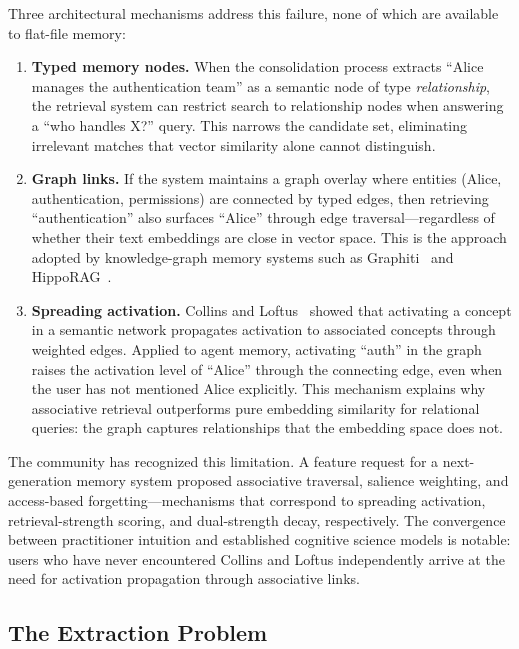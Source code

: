 Three architectural mechanisms address this failure, none of which are
available to flat-file memory:

\begin{enumerate}[leftmargin=*, nosep]
    \item \textbf{Typed memory nodes.}  When the consolidation process
    extracts ``Alice manages the authentication team'' as a semantic
    node of type \emph{relationship}, the retrieval system can restrict
    search to relationship nodes when answering a ``who handles X?''
    query.  This narrows the candidate set, eliminating irrelevant
    matches that vector similarity alone cannot distinguish.

    \item \textbf{Graph links.}  If the system maintains a graph
    overlay where entities (Alice, authentication, permissions) are
    connected by typed edges, then retrieving ``authentication'' also
    surfaces ``Alice'' through edge traversal---regardless of whether
    their text embeddings are close in vector space.  This is the
    approach adopted by knowledge-graph memory systems such as
    Graphiti~\cite{dempsey2025graphiti} and HippoRAG~\cite{gutierrez2024hipporag}.

    \item \textbf{Spreading activation.}  Collins and
    Loftus~\cite{collins1975} showed that activating a concept in a
    semantic network propagates activation to associated concepts through
    weighted edges.  Applied to agent memory, activating ``auth'' in the
    graph raises the activation level of ``Alice'' through the connecting
    edge, even when the user has not mentioned Alice explicitly.  This
    mechanism explains why associative retrieval outperforms pure
    embedding similarity for relational queries: the graph captures
    relationships that the embedding space does not.
\end{enumerate}

The community has recognized this limitation.  A feature request for
a next-generation memory system proposed associative traversal,
salience weighting, and access-based forgetting---mechanisms that
correspond to spreading activation, retrieval-strength scoring, and
dual-strength decay, respectively.  The convergence between practitioner
intuition and established cognitive science models is notable: users
who have never encountered Collins and Loftus independently arrive at
the need for activation propagation through associative links.

\subsection{The Extraction Problem}
\label{sec:memorymd-extraction}

